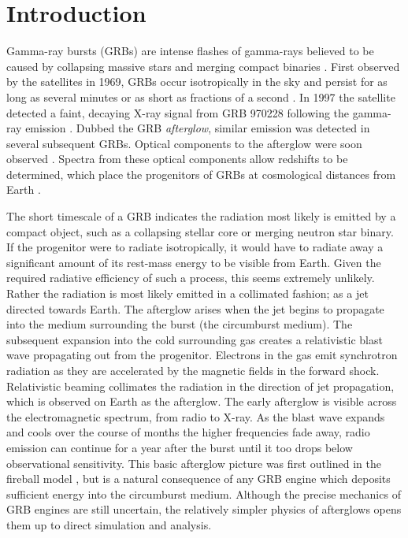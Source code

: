 
\section{Introduction}


Gamma-ray bursts (GRBs) are intense flashes of gamma-rays believed to be caused by collapsing massive stars and merging compact binaries \citep{Woosley93, MacFadyen99, Eichler89}.  First observed by the \vela{} satellites in 1969, GRBs occur isotropically in the sky and persist for as long as several minutes or as short as fractions of a second \citep{Klebesadel73}.  In 1997 the \bepposax{} satellite detected a faint, decaying X-ray signal from GRB 970228 following the gamma-ray emission \citep{Costa97}.  Dubbed the GRB \emph{afterglow}, similar emission was detected in several subsequent GRBs.  Optical components to the afterglow were soon observed \citep{Groot97}.  Spectra from these optical components allow redshifts to be determined, which place the progenitors of GRBs at cosmological distances from Earth \citep{Metzger97}.  

The short timescale of a GRB indicates the radiation most likely is emitted by a compact object, such as a collapsing stellar core or merging neutron star binary.  If the progenitor were to radiate isotropically, it would have to radiate away a significant amount of its rest-mass energy to be visible from Earth.  Given the required radiative efficiency of such a process, this seems extremely unlikely.  Rather the radiation is most likely emitted in a collimated fashion; as a jet directed towards Earth.  The afterglow arises when the jet begins to propagate into the medium surrounding the burst (the circumburst medium).  The subsequent expansion into the cold surrounding gas creates a relativistic blast wave propagating out from the progenitor.  Electrons in the gas emit synchrotron radiation as they are accelerated by the magnetic fields in the forward shock.  Relativistic beaming collimates the radiation in the direction of jet propagation, which is observed on Earth as the afterglow.  The early afterglow is visible across the electromagnetic spectrum, from radio to X-ray.  As the blast wave expands and cools over the course of months the higher frequencies fade away, radio emission can continue for a year after the burst until it too drops below observational sensitivity.  This basic afterglow picture was first outlined in the fireball model \citep{Rees92}, but is a natural consequence of any GRB engine which deposits sufficient energy into the circumburst medium.  Although the precise mechanics of GRB engines are still uncertain, the relatively simpler physics of afterglows opens them up to direct simulation and analysis.

